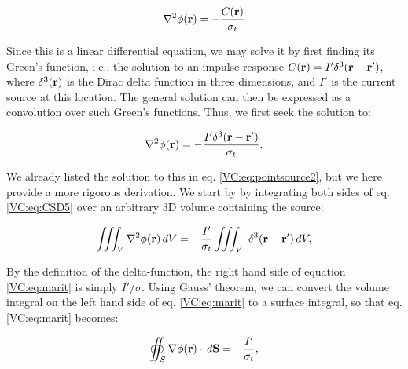 \begin{equation}
\nabla^2 \phi({\bf r}) = - \frac{C({\bf r})}{\sigma_t}
\label{VC:eq:CSD4}
\end{equation}

Since this is a linear differential equation, we may solve it by first finding its Green's function, i.e., the solution to an impulse response $C({\bf r}) = I' \delta^3({\bf r-r'})$, 
where $\delta^3({\bf r})$ is the Dirac delta function in three dimensions, and $I'$ is the current source at this location. The general solution can then be expressed as a convolution over such Green's functions. Thus, we first seek the solution to: 

\begin{equation}
\nabla^2 \phi({\bf r}) = - \frac{I' \delta^3({\bf r-r'})}{\sigma_t}.
\label{VC:eq:CSD5}
\end{equation}

We already listed the solution to this in eq. \ref{VC:eq:pointsource2}, but we here provide a more rigorous derivation. We start by by integrating both sides of eq. \ref{VC:eq:CSD5} over an arbitrary 3D volume containing the source:

\begin{equation}
\iiint_V \nabla^2\phi({\bf r}) \,dV =  - \frac{I'}{\sigma_t} \iiint_V \ \delta^3({\bf r-r'}) \, dV,
\label{VC:eq:marit}
\end{equation}

By the definition of the delta-function, the right hand side of equation \ref{VC:eq:marit} is simply $I'/\sigma$. Using Gauss' theorem, we can convert the volume integral on the left hand side of eq. \ref{VC:eq:marit} to a surface integral, so that eq. \ref{VC:eq:marit} becomes:

\begin{equation}
\oiint_{S} \nabla\phi({\bf r}) \cdot \, d{\bf S}  = - \frac{I'}{\sigma_t},
\label{VC:eq:berit1}
\end{equation}

